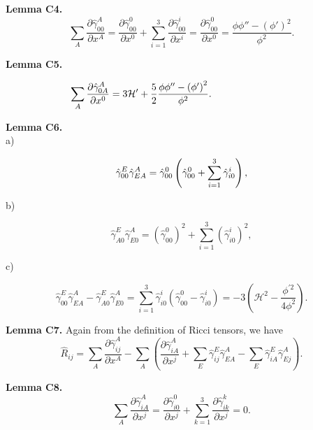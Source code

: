 \documentclass[aps,superscriptaddress, showpacs,preprintnumbers, superscriptaddress, nofootinbibt,twocolumn]{revtex4-2}
\begin{document}
{\bf Lemma C4.}
\begin{equation*}
    \sum_A\frac{\partial \hat{\gamma}_{00}^A}{\partial x^A}=
    \frac{\partial \hat{\gamma}^0_{00}}{\partial x^0}+\sum_{i=1}^3
    \frac{\partial\hat{\gamma}_{00}^i}{\partial x^i}=\frac{\partial \hat{\gamma}^0_{00}}{\partial x^0}=
    \frac{\phi \phi ''-(\phi ')^2}{\phi^2}.
\end{equation*}

{\bf Lemma C5.}

\begin{equation*}
  \hspace{-2.9cm}  \sum_A\frac{\partial \hat{\gamma}_{0A}^A}{\partial x^0}=3\mathcal{H}'+\frac{5}{2}\frac{\phi \phi ''-\left(\phi '\right)^2}{\phi ^2}.
\end{equation*}



{\bf Lemma C6.}\\

a)

\begin{equation*}
\hat{\gamma}_{00}^{E}\hat{\gamma}_{EA}^{A}=\hat{\gamma}_{00}^{0}\left( \hat{%
\gamma}_{00}^{0}+\sum _{i=1}^3\hat{\gamma}_{i0}^{i}\right),
\end{equation*}

b)

\begin{equation*}
\hat{\gamma}_{A0}^{E}\hat{\gamma}_{E0}^{A}=\left(\hat{\gamma}_{00}^{0}\right)^2+\sum _{i=1}^3\left(\hat{\gamma}_{i0}^{i}\right)^2,
\end{equation*}

c)

\begin{equation*}
\hat{\gamma}_{00}^{E}\hat{\gamma}%
_{EA}^{A}-\hat{\gamma}_{A0}^{E}\hat{\gamma}_{E0}^{A}=\sum_{i=1}^3 \hat{\gamma}_{i0}^{i}\left(\hat{\gamma}%
_{00}^{0}- \hat{\gamma}_{i0}^{i}\right) =-3\left( \mathcal{H}^{2}-\frac{\phi ^{\prime 2}}{4\phi
^{2}}\right).
\end{equation*}

{\bf Lemma C7.} Again from the definition of Ricci tensors, we have
\begin{equation*}
    \hat{R}_{ij}=\sum _A \frac{\partial \hat{\gamma}^A_{ij}}{\partial x^A}-\sum_A\left(\frac{\partial \hat{\gamma}^A_{iA}}{\partial x^j}
   +\sum_E\hat{\gamma}_{ij}^E\hat{\gamma}^A_{EA}-
    \sum_E\hat{\gamma}_{iA}^E\hat{\gamma}^A_{Ej}
    \right).
\end{equation*}

{\bf Lemma C8.}
\begin{equation*}
    \sum_A\frac{\partial \hat{\gamma}^A_{iA}}{\partial x^j}=
    \frac{\partial \hat{\gamma}^0_{i0}}{\partial x^j}+
    \sum_{k=1}^3\frac{\partial \hat{\gamma}^k_{ik}}{\partial x^j}=0.
\end{equation*}
\end{document}

